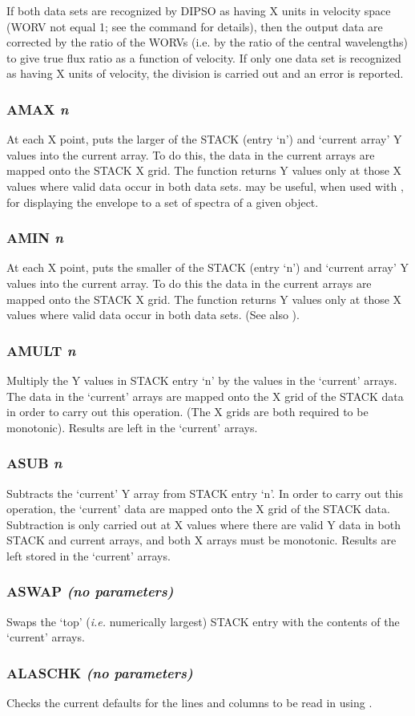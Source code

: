 \documentclass[twoside,11pt,noabs,nolof]{starlink}
\providecommand{\dipcom}[3]{\subsubsection*{\label{COM:#1}\textbf{#1} \emph{#2}}}
\begin{document}
If both data sets are recognized by DIPSO as having X units in velocity
space (WORV not equal 1; see the   command for details), then the
output data are corrected by the ratio of the WORVs (i.e. by the ratio
of the central wavelengths) to give true flux ratio as a function of
velocity. If only one data set is recognized as having X units of
velocity, the division is carried out and an error is reported.

\dipcom{AMAX}{n}{Takes the maximum of the Y values in two arrays}
At each X point, puts the larger of the STACK (entry `n') and `current
array' Y values into the current array. To do this, the data in the
current arrays are mapped onto the STACK X grid. The function returns
Y values only at those X values where valid data occur in both
data sets.   may be useful, when used with ,  for displaying the
envelope to a set of spectra of a given object.

\dipcom{AMIN}{n}{Takes the minimum of the Y values in two arrays}
At each X point, puts the smaller of the STACK (entry `n') and
`current array' Y values into the current array. To do this the data
in the current arrays are mapped onto the STACK X grid. The function
returns Y values only at those X values where valid data occur in both
data sets. (See also ).

\dipcom{AMULT}{n}{Multiplies the Y values in two arrays}
Multiply the Y values in STACK entry `n' by the values in the
`current' arrays. The data in the `current' arrays are mapped onto the
X grid of the STACK data in order to carry out this operation. (The X
grids are both required to be monotonic). Results are left in the
`current' arrays.

\dipcom{ASUB}{n}{Subtracts the Y values in two arrays}
Subtracts the `current' Y array from STACK entry `n'. In order to
carry out this operation, the `current' data are mapped onto the X
grid of the STACK data. Subtraction is only carried out at X values
where there are valid Y data in both STACK and current arrays, and
both X arrays must be monotonic. Results are left stored in the
`current' arrays.

\dipcom{ASWAP}{(no parameters)}{Swaps the Y values in two arrays}
Swaps the `top' (\emph{i.e.} numerically largest) STACK entry with the
contents of the `current' arrays.

\dipcom{ALASCHK}{(no parameters)}{Checks the lines and columns to be used by {\texttt{ALASRD}}}
Checks the current defaults for the lines and columns to be read in
using .
\end{document}
